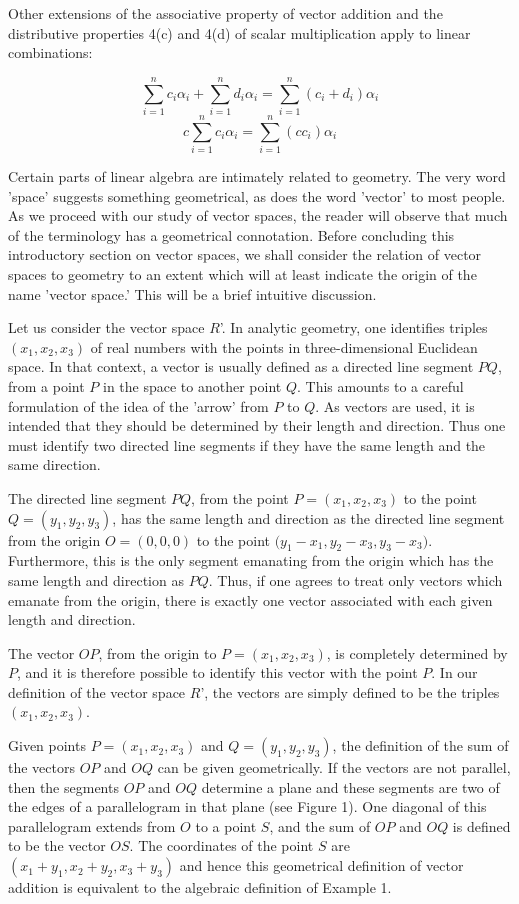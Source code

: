 Other extensions of the associative property of vector addition and the distributive properties 4(c) and 4(d) of scalar multiplication apply to linear combinations:

\[\sum\limits_{i=1}^{n}c_{i}\alpha_{i}+\sum\limits_{i=1}^{n}d_{i} \alpha_{i} =\sum\limits_{i=1}^{n}(c_{i}+d_{i})\alpha_{i}\] \[c\sum\limits_{i=1}^{n}c_{i}\alpha_{i} =\sum\limits_{i=1}^{n}(cc_{i})\alpha_{i}\]

Certain parts of linear algebra are intimately related to geometry. The very word 'space' suggests something geometrical, as does the word 'vector' to most people. As we proceed with our study of vector spaces, the reader will observe that much of the terminology has a geometrical connotation. Before concluding this introductory section on vector spaces, we shall consider the relation of vector spaces to geometry to an extent which will at least indicate the origin of the name 'vector space.' This will be a brief intuitive discussion.

Let us consider the vector space \(R\)'. In analytic geometry, one identifies triples \((x_{1},x_{2},x_{3})\) of real numbers with the points in three-dimensional Euclidean space. In that context, a vector is usually defined as a directed line segment \(PQ\), from a point \(P\) in the space to another point \(Q\). This amounts to a careful formulation of the idea of the 'arrow' from \(P\) to \(Q\). As vectors are used, it is intended that they should be determined by their length and direction. Thus one must identify two directed line segments if they have the same length and the same direction.

The directed line segment \(PQ\), from the point \(P=(x_{1},x_{2},x_{3})\) to the point \(Q=(y_{1},y_{2},y_{3})\), has the same length and direction as the directed line segment from the origin \(O=(0,0,0)\) to the point \((y_{1}-x_{1},y_{2}-x_{3},\)\(y_{3}-x_{3})\). Furthermore, this is the only segment emanating from the origin which has the same length and direction as \(PQ\). Thus, if one agrees to treat only vectors which emanate from the origin, there is exactly one vector associated with each given length and direction.

The vector \(OP\), from the origin to \(P=(x_{1},x_{2},x_{3})\), is completely determined by \(P\), and it is therefore possible to identify this vector with the point \(P\). In our definition of the vector space \(R\)', the vectors are simply defined to be the triples \((x_{1},x_{2},x_{3})\).

Given points \(P=(x_{1},x_{2},x_{3})\) and \(Q=(y_{1},y_{2},y_{3})\), the definition of the sum of the vectors \(OP\) and \(OQ\) can be given geometrically. If the vectors are not parallel, then the segments \(OP\) and \(OQ\) determine a plane and these segments are two of the edges of a parallelogram in that plane (see Figure 1). One diagonal of this parallelogram extends from \(O\) to a point \(S\), and the sum of \(OP\) and \(OQ\) is defined to be the vector \(OS\). The coordinates of the point \(S\) are \((x_{1}+y_{1},x_{2}+y_{2},x_{3}+y_{3})\) and hence this geometrical definition of vector addition is equivalent to the algebraic definition of Example 1.

 